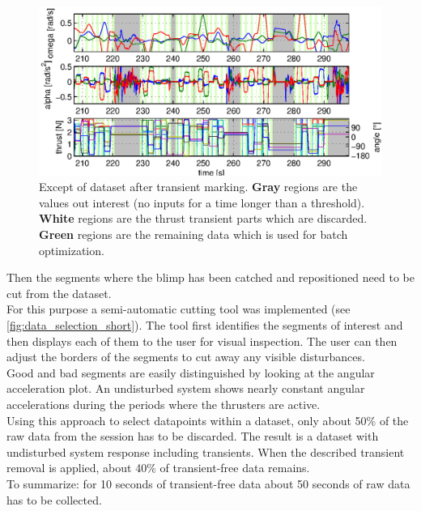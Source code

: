 \begin{figure}[htbp]
\centering
\includegraphics[scale=0.8]{images/interactive_cut/interactive_cut_long_modified.eps}
\caption{Except of dataset after transient marking. \textbf{Gray} regions are the values out interest (no inputs for a time longer than a threshold). \textbf{White} regions are the thrust transient parts which are discarded. \textbf{Green} regions are the remaining data which is used for batch optimization.}
\label{fig:data_selection_long}
\end{figure}

Then the segments where the blimp has been catched and repositioned need to be cut from the dataset. \\
For this purpose a semi-automatic cutting tool was implemented (see \cref{fig:data_selection_short}). 
The tool first identifies the segments of interest and then displays each of them to the user for visual inspection.
The user can then adjust the borders of the segments to cut away any visible disturbances. \\
Good and bad segments are easily distinguished by looking at the angular acceleration plot.
An undisturbed system shows nearly constant angular accelerations during the periods where the thrusters are active. \\
Using this approach to select datapoints within a dataset, only about 50\% of the raw data from the session has to be discarded.
The result is a dataset with undisturbed system response including transients.
When the described transient removal is applied, about 40\% of transient-free data remains.\\
To summarize: for 10 seconds of transient-free data about 50 seconds of raw data has to be collected.

